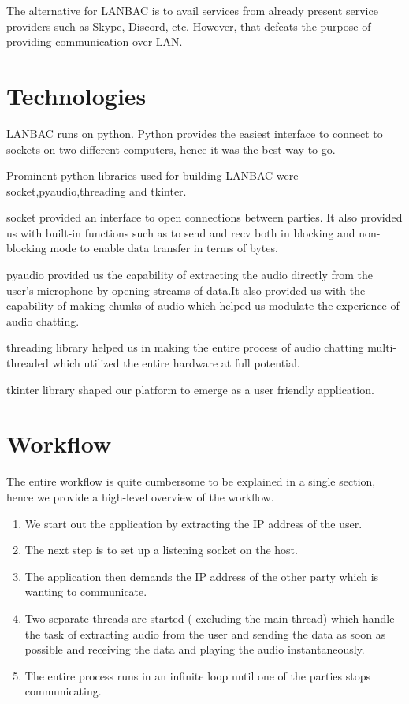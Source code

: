 \documentclass[12pt]{article}
\begin{document}
The alternative for LANBAC is to avail services from already present service providers such as Skype, Discord, etc. However, that defeats the purpose of providing communication over LAN. 



\section{Technologies}
LANBAC runs on python. Python provides the easiest interface to connect to sockets on two different computers, hence it was the best way to go.

Prominent python libraries used for building LANBAC were socket,pyaudio,threading and tkinter.

socket provided an interface to open connections between parties. It also provided us with built-in functions such as to send and recv both in blocking and non-blocking mode to enable data transfer in terms of bytes.


pyaudio provided us the capability of extracting the audio directly from the user's microphone by opening streams of data.It also provided us with the capability of making chunks of audio which helped us modulate the experience of audio chatting.


threading library helped us in making the entire process of audio chatting multi-threaded which utilized the entire hardware at full potential.

tkinter library shaped our platform to emerge as a user friendly application. 

\section{Workflow}


The entire workflow is quite cumbersome to be explained in a single section, hence we provide a high-level overview of the workflow.

\begin{enumerate}
  \item We start out the application by extracting the IP address of the user.

  \item The next step is to set up a listening socket on the host.
  
  \item The application then demands the IP address of the other party which is wanting to communicate.
  
  \item Two separate threads are started ( excluding the main thread) which handle the task of extracting audio from the user and sending the data as soon as possible and receiving the data and playing the audio instantaneously.
  
  \item The entire process runs in an infinite loop until one of the parties stops communicating.
\end{enumerate}
  
\end{document}
